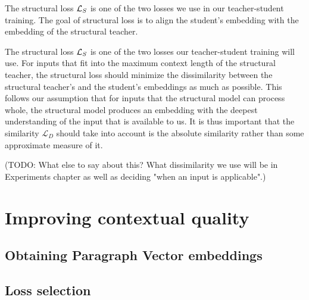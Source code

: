 %

The structural loss $\mathcal{L}_S$ is one of the two losses we use in our
teacher-student training. The goal of structural loss is to align the student's
embedding with the embedding of the structural teacher.

The structural loss $\mathcal{L}_S$ is one of the two losses our teacher-student
training will use. For inputs that fit into the maximum context length of the
structural teacher, the structural loss should minimize the dissimilarity
between the structural teacher's and the student's embeddings as much as
possible. This follows our assumption that for inputs that the structural model
can process whole, the structural model produces an embedding with the deepest
understanding of the input that is available to us. It is thus important that
the similarity $\mathcal{L}_D$ should take into account is the absolute
similarity rather than some approximate measure of it.

(TODO: What else to say about this? What dissimilarity we use will be in
Experiments chapter as well as deciding "when an input is applicable".)


\section{Improving contextual quality}\label{section:improving_contextual}

\subsection{Obtaining Paragraph Vector embeddings}

\subsection{Loss selection}

